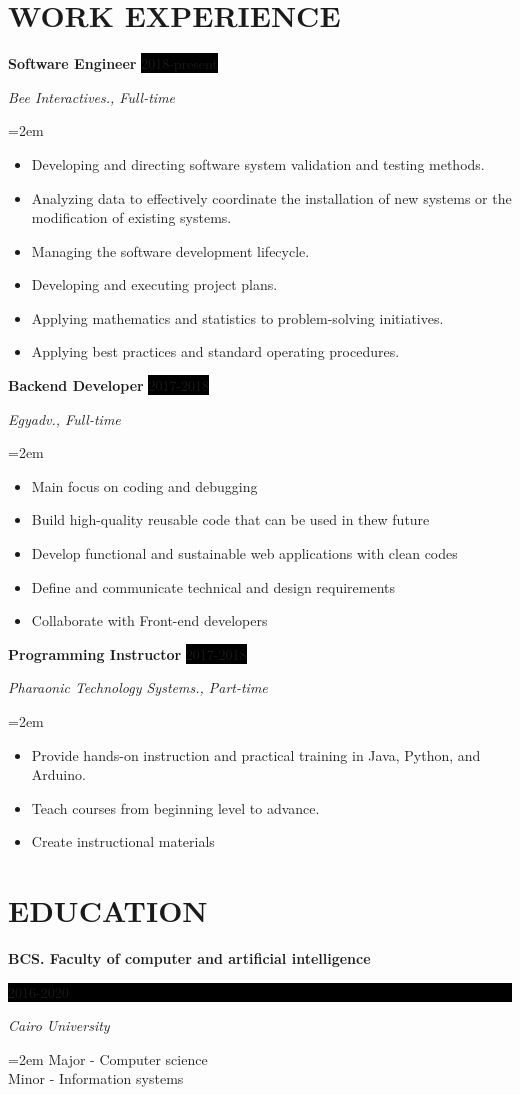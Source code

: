 \documentclass[paper=a4,fontsize=11pt]{scrartcl} %
\newcommand{\sepspace}{\vspace*{1em}}		%
\newcommand{\NewPart}[1]{\section*{\uppercase{#1}}}
\newcommand{\EducationEntry}[4]{
		\noindent \textbf{#1} \hfill      %
		\colorbox{Black}{%
			\parbox{6em}{%
			\hfill\color{White}#2}} \par  %
		\noindent \textit{#3} \par        %
		\noindent\hangindent=2em\hangafter=0 \small #4 %
		\normalsize \par}
\newcommand{\WorkEntry}[4]{				  %
		\noindent \textbf{#1} \hfill      %
		\colorbox{Black}{\color{White}#2} \par  %
		\noindent \textit{#3} \par              %
		\noindent\hangindent=2em\hangafter=0 \small #4 %
		\normalsize \par}
\begin{document}
\NewPart{Work experience}{

\WorkEntry{Software Engineer}{2018-present}{Bee Interactives., Full-time}{
\begin{itemize}
\item Developing and directing software system validation and testing methods.
\item Analyzing data to effectively coordinate the installation of new systems or the modification of existing systems.
\item Managing the software development lifecycle.
\item Developing and executing project plans.
\item Applying mathematics and statistics to problem-solving initiatives.
\item Applying best practices and standard operating procedures.
\end{itemize}
}


\WorkEntry{Backend Developer}{2017-2018}{Egyadv., Full-time}{
\begin{itemize}
\item Main focus on coding and debugging
\item Build high-quality reusable code that can be used in thew future
\item Develop functional and sustainable web applications with clean codes
\item Define and communicate technical and design requirements
\item Collaborate with Front-end developers 
\end{itemize}
}

\sepspace
\WorkEntry{Programming Instructor}{2017-2018}{Pharaonic Technology Systems., Part-time}{
\begin{itemize}
\item Provide hands-on instruction and practical training in Java, Python, and Arduino.
\item Teach courses from beginning level to advance.
\item Create instructional materials
\end{itemize}
}

}

\NewPart{Education}{}

\EducationEntry{BCS. Faculty of computer and artificial intelligence}{2016-2020}{Cairo
  University}{Major - Computer science \\ Minor - Information systems}
\sepspace
\end{document}
